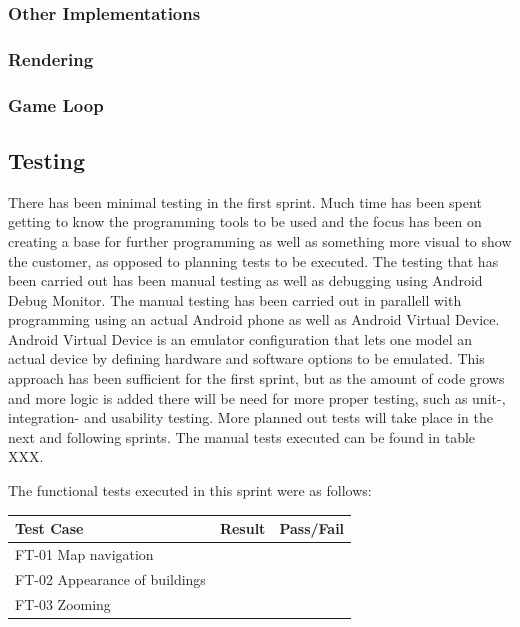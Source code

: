 \subsubsection*{Other Implementations}
	\subsubsection*{Rendering}
	\subsubsection*{Game Loop}

\subsection{Testing}

There has been minimal testing in the first sprint. Much time has been spent getting to know the programming tools to be used and the focus has been on creating a base for further programming as well as something more visual to show the customer, as opposed to planning tests to be executed. The testing that has been carried out has been manual testing as well as debugging using Android Debug Monitor. The manual testing has been carried out in parallell with programming using an actual Android phone as well as Android Virtual Device. Android Virtual Device is an emulator configuration that lets one model an actual device by defining hardware and software options to be emulated. This approach has been sufficient for the first sprint, but as the amount of code grows and more logic is added there will be need for more proper testing, such as unit-, integration- and usability testing. More planned out tests will take place in the next and following sprints. The manual tests executed can be found in table XXX.


The functional tests executed in this sprint were as follows:


\begin{tabular}{| l | l | l |}
	\hline
	\rowcolor{lightgray}
	{\bf Test Case} & {\bf Result} & {\bf Pass/Fail} \\ \hline
	FT-01 Map navigation & & \\ \hline
  	FT-02 Appearance of buildings & & \\ \hline
	FT-03 Zooming & & \\ \hline
\end{tabular}

